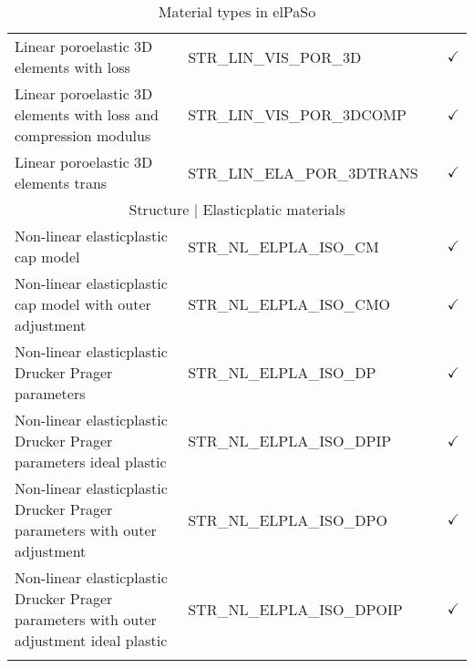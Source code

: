 \begin{longtable}{p{6cm}p{6cm}cc}
    Linear poroelastic 3D elements with loss                                                                   & STR\_LIN\_VIS\_POR\_3D            &                                 & $\checkmark$                        \\
    Linear poroelastic 3D elements with loss   and compression modulus                                         & STR\_LIN\_VIS\_POR\_3DCOMP        &                                 & $\checkmark$                        \\
    Linear poroelastic 3D elements trans                                                                       & STR\_LIN\_ELA\_POR\_3DTRANS       &                                 & $\checkmark$                        \\\hline
    \multicolumn{4}{c}{Structure |   Elasticplatic materials}                                                                                                                                                              \\\hline
    Non-linear elasticplastic cap model                                                                        & STR\_NL\_ELPLA\_ISO\_CM           &                                 & $\checkmark$                        \\
    Non-linear elasticplastic cap model with   outer adjustment                                                & STR\_NL\_ELPLA\_ISO\_CMO          &                                 & $\checkmark$                        \\
    Non-linear elasticplastic Drucker Prager   parameters                                                      & STR\_NL\_ELPLA\_ISO\_DP           &                                 & $\checkmark$                        \\
    Non-linear elasticplastic Drucker Prager   parameters ideal plastic                                        & STR\_NL\_ELPLA\_ISO\_DPIP         &                                 & $\checkmark$                        \\
    Non-linear elasticplastic Drucker Prager   parameters with outer adjustment                                & STR\_NL\_ELPLA\_ISO\_DPO          &                                 & $\checkmark$                        \\
    Non-linear elasticplastic Drucker Prager   parameters with outer adjustment ideal plastic                  & STR\_NL\_ELPLA\_ISO\_DPOIP        &                                 & $\checkmark$                       \\ \hline
    \caption{Material types in elPaSo}
    \label{tab:MaterialTypes}
\end{longtable}

